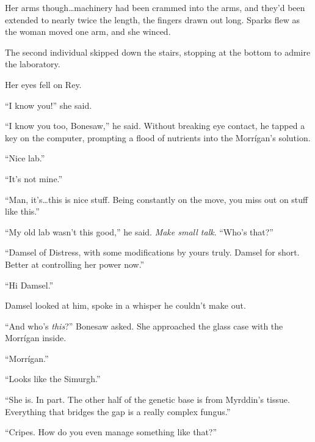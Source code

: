 Her arms though\ldots machinery had been crammed into the arms, and they'd been extended to nearly twice the length, the fingers drawn out long.  Sparks flew as the woman moved one arm, and she winced.



The second individual skipped down the stairs, stopping at the bottom to admire the laboratory.



Her eyes fell on Rey.



``I know you!'' she said.



``I know you too, Bonesaw,'' he said.  Without breaking eye contact, he tapped a key on the computer, prompting a flood of nutrients into the Morr\'{i}gan's solution.



``Nice lab.''



``It's not mine.''



``Man, it's\ldots this is nice stuff.  Being constantly on the move, you miss out on stuff like this.''



``My old lab wasn't this good,'' he said.  \emph{Make small talk}.  ``Who's that?''



``Damsel of Distress, with some modifications by yours truly.  Damsel for short.  Better at controlling her power now.''



``Hi Damsel.''



Damsel looked at him, spoke in a whisper he couldn't make out.



``And who's \emph{this}?'' Bonesaw asked.  She approached the glass case with the Morr\'{i}gan inside.



``Morr\'{i}gan.''



``Looks like the Simurgh.''



``She is.  In part.  The other half of the genetic base is from Myrddin's tissue.  Everything that bridges the gap is a really complex fungus.''



``Cripes.  How do you even manage something like that?''



